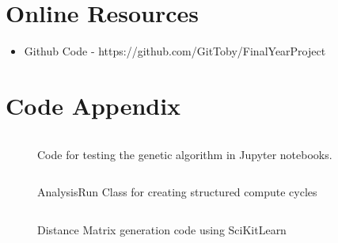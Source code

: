 \begin{appendices}
    \chapter{Online Resources}\label{apndx:resources}
    \begin{itemize}
        \item Github Code - https://github.com/GitToby/FinalYearProject
    \end{itemize}
    \chapter{Code Appendix}\label{apndx:code}
    \begin{figure}[ht]
        \inputminted[fontsize=\small]{python}{./code_snippets/appendix/runGeneticAlgo.py}
        \caption{Code for testing the genetic algorithm in Jupyter notebooks.}\label{apcode:runGeneticAlgo.py}
    \end{figure}

    \begin{figure}[ht]
        \inputminted[fontsize=\small]{python}{./code_snippets/appendix/AnalysisRun.py}
        \caption{AnalysisRun Class for creating structured compute cycles}\label{apcode:AnalysisRun.py}
    \end{figure}

    \begin{figure}[ht]
        \inputminted[fontsize=\small]{python}{./code_snippets/appendix/dist_matrix.py}
        \caption{Distance Matrix generation code using SciKitLearn}\label{apcode:dist_matrix.py}
    \end{figure}


\end{appendices}
